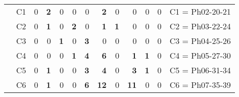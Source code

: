 \begin{table}[H]
{\begin{tabular}{|ccrrrrrrrrrrc|}
\multicolumn{1}{|c|}{}                                      & \multicolumn{1}{c|}{C1} & \multicolumn{1}{r|}{0}  & \multicolumn{1}{r|}{\textbf{2}} & \multicolumn{1}{r|}{0}          & \multicolumn{1}{r|}{0}          & \multicolumn{1}{r|}{0}          & \multicolumn{1}{r|}{\textbf{2}}  & \multicolumn{1}{r|}{0}          & \multicolumn{1}{r|}{0}           & \multicolumn{1}{r|}{0}          & \multicolumn{1}{r|}{0}          & C1 = Ph02-20-21   \\ \cline{2-13}
\multicolumn{1}{|c|}{}                                      & \multicolumn{1}{c|}{C2} & \multicolumn{1}{r|}{0}  & \multicolumn{1}{r|}{\textbf{1}} & \multicolumn{1}{r|}{0}          & \multicolumn{1}{r|}{\textbf{2}} & \multicolumn{1}{r|}{0}          & \multicolumn{1}{r|}{\textbf{1}}  & \multicolumn{1}{r|}{\textbf{1}} & \multicolumn{1}{r|}{0}           & \multicolumn{1}{r|}{0}          & \multicolumn{1}{r|}{0}          & C2 = Ph03-22-24   \\ \cline{2-13}
\multicolumn{1}{|c|}{}                                      & \multicolumn{1}{c|}{C3} & \multicolumn{1}{r|}{0}  & \multicolumn{1}{r|}{0}          & \multicolumn{1}{r|}{\textbf{1}} & \multicolumn{1}{r|}{0}          & \multicolumn{1}{r|}{\textbf{3}} & \multicolumn{1}{r|}{0}           & \multicolumn{1}{r|}{0}          & \multicolumn{1}{r|}{0}           & \multicolumn{1}{r|}{0}          & \multicolumn{1}{r|}{0}          & C3 = Ph04-25-26   \\ \cline{2-13}
\multicolumn{1}{|c|}{}                                      & \multicolumn{1}{c|}{C4} & \multicolumn{1}{r|}{0}  & \multicolumn{1}{r|}{0}          & \multicolumn{1}{r|}{0}          & \multicolumn{1}{r|}{\textbf{1}} & \multicolumn{1}{r|}{\textbf{4}} & \multicolumn{1}{r|}{\textbf{6}}  & \multicolumn{1}{r|}{0}          & \multicolumn{1}{r|}{\textbf{1}}  & \multicolumn{1}{r|}{\textbf{1}} & \multicolumn{1}{r|}{0}          & C4 = Ph05-27-30   \\ \cline{2-13}
\multicolumn{1}{|c|}{}                                      & \multicolumn{1}{c|}{C5} & \multicolumn{1}{r|}{0}  & \multicolumn{1}{r|}{\textbf{1}} & \multicolumn{1}{r|}{0}          & \multicolumn{1}{r|}{0}          & \multicolumn{1}{r|}{\textbf{3}} & \multicolumn{1}{r|}{\textbf{4}}  & \multicolumn{1}{r|}{0}          & \multicolumn{1}{r|}{\textbf{3}}  & \multicolumn{1}{r|}{\textbf{1}} & \multicolumn{1}{r|}{0}          & C5 = Ph06-31-34   \\ \cline{2-13}
\multicolumn{1}{|c|}{}                                      & \multicolumn{1}{c|}{C6} & \multicolumn{1}{r|}{0}  & \multicolumn{1}{r|}{\textbf{1}} & \multicolumn{1}{r|}{0}          & \multicolumn{1}{r|}{0}          & \multicolumn{1}{r|}{\textbf{6}} & \multicolumn{1}{r|}{\textbf{12}} & \multicolumn{1}{r|}{0}          & \multicolumn{1}{r|}{\textbf{11}} & \multicolumn{1}{r|}{0}          & \multicolumn{1}{r|}{0}          & C6 = Ph07-35-39   \\ \cline{2-13}

\end{tabular}}
\end{table}
